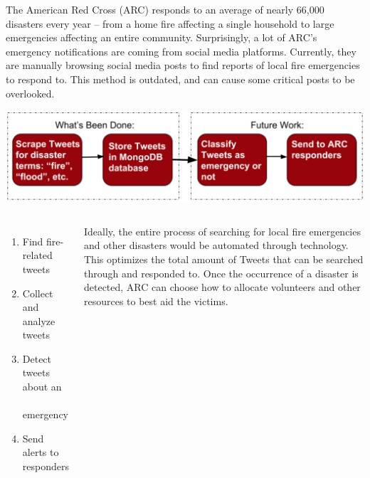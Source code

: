 \documentclass
[
blockverticalspace=-0.8cm
]
{tikzposter}
\begin{document}
{
    \fontsize{36pt}{14pt}\selectfont
    The American Red Cross (ARC) responds to an average of nearly 66,000 disasters every year – from a home fire affecting a single household to large emergencies affecting an entire community. Surprisingly, a lot of ARC’s emergency notifications are coming from social media platforms. Currently, they are manually browsing social media posts to find reports of local fire emergencies to respond to. This method is outdated, and can cause some critical posts to be overlooked.

    \begin{tikzfigure}
        \includegraphics[scale=1.5]{ii.png}
    \end{tikzfigure}

}

\begin{columns}

    {
        

        \fontsize{36pt}{14pt}\selectfont
        \begin{enumerate}
            \item Find fire-related tweets
            \item Collect and analyze tweets
            \item Detect tweets about an \\\\emergency
            \item Send alerts to responders
        \end{enumerate}
    }
    
    {
        \fontsize{36pt}{14pt}\selectfont
        Ideally, the entire process of searching for local fire emergencies and other disasters would be automated through technology. This optimizes the total amount of Tweets that can be searched through and responded to. Once the occurrence of a disaster is detected, ARC can choose how to allocate volunteers and other resources to best aid the victims. 
    }

\end{columns}
\end{document}
